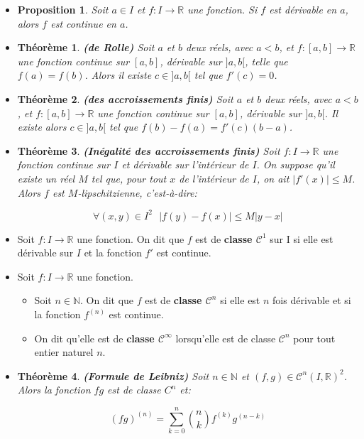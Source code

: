 \documentclass[10pt,a4paper,oneside]{article}
\newtheorem{theoreme}{Théorème}
\newtheorem{proposition}{Proposition}
\begin{document}
\begin{itemize}
\item
\begin{proposition}
Soit $a \in I$ et $f : I \to \mathbb{R}$ une fonction. Si $f$ est dérivable en $a$, alors $f$ est continue en $a$.
\end{proposition}

\item
\begin{theoreme} \textbf{(de Rolle)}
Soit $a$ et $b$ deux réels, avec $a < b$, et $f : [a,b] \to \mathbb{R}$ une fonction continue sur $[a,b]$, dérivable sur $]a,b[$, telle que $f(a) = f(b)$.
Alors il existe $c \in ]a,b[$ tel que $f'(c) = 0$.
\end{theoreme}

\item
\begin{theoreme} \textbf{(des accroissements finis)}
Soit $a$ et $b$ deux réels, avec $a < b$, et $f : [a,b] \to \mathbb{R}$ une fonction continue sur $[a,b]$, dérivable sur $]a,b[$.
Il existe alors $c \in ]a,b[$ tel que $f(b) - f(a) = f'(c)(b - a)$.
\end{theoreme}

\item
\begin{theoreme} \textbf{(Inégalité des accroissements finis)}
Soit $f : I \to \mathbb{R}$ une fonction continue sur $I$ et dérivable sur l'intérieur de $I$. On suppose qu'il existe un réel $M$ tel que, pour tout $x$ de l'intérieur de $I$, on ait $|f'(x)| \leq M$. Alors $f$ est $M$-lipschitzienne, c'est-à-dire:

\[ \forall(x,y) \in I^2 \text{ } |f(y) - f(x)| \leq M|y - x| \]
\end{theoreme}

\item
Soit $f : I \to \mathbb{R}$ une fonction. On dit que $f$ est de \textbf{classe $\mathcal{C}^1$} sur I si elle est dérivable sur $I$ et la fonction $f'$ est continue.

\item
Soit $f : I \to \mathbb{R}$ une fonction.

\begin{itemize}
\item
Soit $n \in \mathbb{N}$. On dit que $f$ est de \textbf{classe $\mathcal{C}^n$} si elle est $n$ fois dérivable et si la fonction $f^{(n)}$ est continue.

\item
On dit qu'elle est de \textbf{classe $\mathcal{C}^\infty$} lorsqu'elle est de classe $\mathcal{C}^n$ pour tout entier naturel $n$.

\end{itemize}

\item
\begin{theoreme} \textbf{(Formule de Leibniz)}
Soit $n \in \mathbb{N}$ et $(f,g) \in \mathcal{C}^n(I,\mathbb{R})^2$. Alors la fonction $fg$ est de classe $C^n$ et:

\[ (fg)^{(n)} = \sum_{k = 0}^n \binom{n}{k} f^{(k)} g^{(n - k)} \]
\end{theoreme}

\end{itemize}
\end{document}
